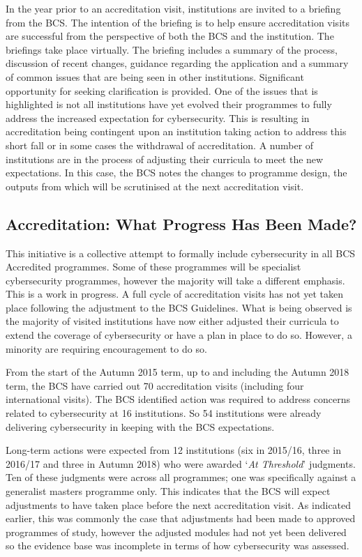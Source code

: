 \documentclass[conference]{IEEEtran}
\begin{document}
In the year prior to an accreditation visit, institutions are invited to a briefing from the BCS. The intention of the briefing is to help ensure accreditation visits are successful from the perspective of both the BCS and the institution. The briefings take place virtually. The briefing includes a summary of the process, discussion of recent changes, guidance regarding the application and a summary of common issues that are being seen in other institutions. Significant opportunity for seeking clarification is provided. One of the issues that is highlighted is not all institutions have yet evolved their programmes to fully address the increased expectation for cybersecurity. This is resulting in accreditation being contingent upon an institution taking action to address this short fall or in some cases the withdrawal of accreditation. A number of institutions are in the process of adjusting their curricula to meet the new expectations. In this case, the BCS notes the changes to programme design, the outputs from which will be scrutinised at the next accreditation visit.

\subsection{Accreditation: What Progress Has Been Made?}

This initiative is a collective attempt to formally include cybersecurity in all BCS Accredited programmes. Some of these programmes will be specialist cybersecurity programmes, however the majority will take a different emphasis. This is a work in progress. A full cycle of accreditation visits has not yet taken place following the adjustment to the BCS Guidelines. What is being observed is the majority of visited institutions have now either adjusted their curricula to extend the coverage of cybersecurity or have a plan in place to do so. However, a minority are requiring encouragement to do so.

From the start of the Autumn 2015 term, up to and including the Autumn 2018 term, the BCS have carried out 70 accreditation visits (including four international visits). The BCS identified action was required to address concerns related to cybersecurity at 16 institutions. So 54 institutions were already delivering cybersecurity in keeping with the BCS expectations.

Long-term actions were expected from 12 institutions (six in 2015/16, three in 2016/17 and three in Autumn 2018) who were awarded `{\emph{At Threshold}}' judgments. Ten of these judgments were across all programmes; one was specifically against a generalist masters programme only. This indicates that the BCS will expect adjustments to have taken place before the next accreditation visit. As indicated earlier, this was commonly the case that adjustments had been made to approved programmes of study, however the adjusted modules had not yet been delivered so the evidence base was incomplete in terms of how cybersecurity was assessed.
 
\end{document}
